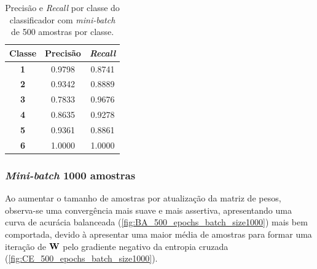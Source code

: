 \begin{table}[H]
	\centering
	\begin{tabular}{c|c|c}
		\textbf{Classe} & \textbf{Precisão} & \textit{\textbf{Recall}} \\ \hline
		\textbf{1}      & 0.9798            & 0.8741                   \\
		\textbf{2}      & 0.9342            & 0.8889                   \\
		\textbf{3}      & 0.7833            & 0.9676                   \\
		\textbf{4}      & 0.8635            & 0.9278                   \\
		\textbf{5}      & 0.9361            & 0.8861                   \\
		\textbf{6}      & 1.0000            & 1.0000                  
	\end{tabular}
	\caption{Precisão e \textit{Recall} por classe do classificador com \textit{mini-batch} de 500 amostras por classe.}
	\label{tab:pr_lr_500}
\end{table}



\subsubsection*{\textit{Mini-batch} 1000 amostras}

Ao aumentar o tamanho de amostras por atualização da matriz de pesos, observa-se uma convergência mais suave e mais assertiva, apresentando uma curva de acurácia balanceada (\autoref{fig:BA_500_epochs_batch_size1000}) mais bem comportada, devido à apresentar uma maior média de amostras para formar uma iteração de $\mathbf{W}$ pelo gradiente negativo da entropia cruzada (\autoref{fig:CE_500_epochs_batch_size1000}).

